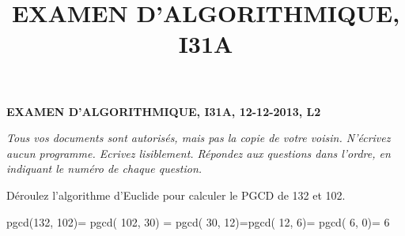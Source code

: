 \documentclass[11pt]{article}
\begin{document}
\title{EXAMEN D'ALGORITHMIQUE, I31A}
\date{}%
{\bf\large EXAMEN D'ALGORITHMIQUE, I31A, 12-12-2013, L2} 

\medskip

{\it Tous vos documents sont autorisés, mais pas la copie de votre voisin.
N'écrivez aucun programme.
Ecrivez lisiblement.
Répondez aux questions dans l'ordre, en indiquant le numéro de chaque question.
}

\newcommand\q[1]{\medskip \noindent {\bf #1.}}
\medskip 

\q{1}  {D\'eroulez l'algorithme d'Euclide pour calculer le PGCD de 132 et 102}.

\medskip
pgcd(132, 102)= pgcd( 102, 30) = pgcd( 30, 12)=pgcd( 12, 6)= pgcd( 6, 0)= 6
\end{document}
